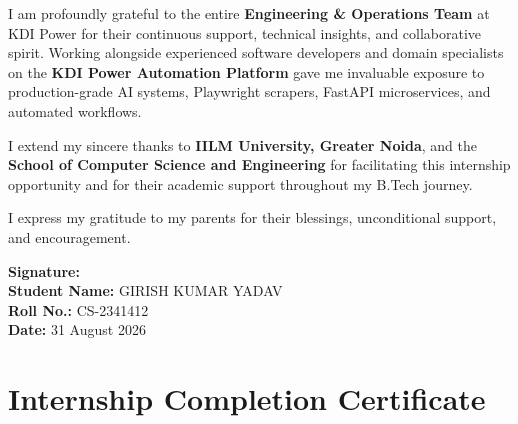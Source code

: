\documentclass[12pt,a4paper]{report}
\begin{document}
I am profoundly grateful to the entire \textbf{Engineering \& Operations Team} at KDI Power for their continuous support, technical insights, and collaborative spirit. Working alongside experienced software developers and domain specialists on the \textbf{KDI Power Automation Platform} gave me invaluable exposure to production-grade AI systems, Playwright scrapers, FastAPI microservices, and automated workflows.

I extend my sincere thanks to \textbf{IILM University, Greater Noida}, and the \textbf{School of Computer Science and Engineering} for facilitating this internship opportunity and for their academic support throughout my B.Tech journey.

I express my gratitude to my parents for their blessings, unconditional support, and encouragement.

\vspace{2cm}

\noindent
\textbf{Signature:} \underline{\hspace{5cm}}\\[0.5cm]
\textbf{Student Name:} GIRISH KUMAR YADAV\\[0.3cm]
\textbf{Roll No.:} CS-2341412\\[0.3cm]
\textbf{Date:} 31 August 2026

\newpage

\thispagestyle{empty}
\chapter*{Internship Completion Certificate}

\vspace{1.5cm}
\end{document}
